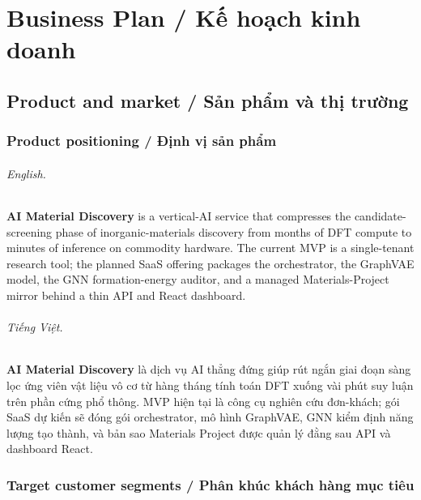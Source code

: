 \documentclass[11pt,a4paper]{report}
\begin{document}
\part{Business Plan / Kế hoạch kinh doanh}

\chapter{Product and market / Sản phẩm và thị trường}

\section{Product positioning / Định vị sản phẩm}

\paragraph{English.}
\textbf{AI Material Discovery} is a vertical-AI service that compresses the
candidate-screening phase of inorganic-materials discovery from months of DFT compute to
minutes of inference on commodity hardware. The current MVP is a single-tenant research
tool; the planned SaaS offering packages the orchestrator, the GraphVAE model, the GNN
formation-energy auditor, and a managed Materials-Project mirror behind a thin API and
React dashboard.

\paragraph{Tiếng Việt.}
\textbf{AI Material Discovery} là dịch vụ AI thẳng đứng giúp rút ngắn giai đoạn sàng lọc ứng
viên vật liệu vô cơ từ hàng tháng tính toán DFT xuống vài phút suy luận trên phần cứng phổ
thông. MVP hiện tại là công cụ nghiên cứu đơn-khách; gói SaaS dự kiến sẽ đóng gói orchestrator,
mô hình GraphVAE, GNN kiểm định năng lượng tạo thành, và bản sao Materials Project được quản
lý đằng sau API và dashboard React.

\section{Target customer segments / Phân khúc khách hàng mục tiêu}
\end{document}
